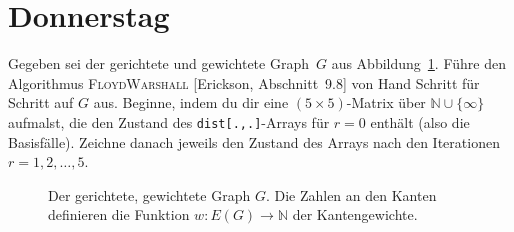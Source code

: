\documentclass{uebung_cs}
\begin{document}
\section*{Donnerstag}

\begin{aufgabe}
  Gegeben sei der gerichtete und gewichtete Graph~$G$ aus Abbildung~\ref{example_graph}.
  Führe den Algorithmus \textsc{FloydWarshall} [Erickson, Abschnitt~9.8] von Hand Schritt für Schritt auf $G$ aus. 
  Beginne, indem du dir eine $(5\times 5)$-Matrix über $\mathbb N\cup\{\infty\}$ aufmalst, die den Zustand des \texttt{dist[.,.]}-Arrays für $r=0$ enthält (also die Basisfälle).
  Zeichne danach jeweils den Zustand des Arrays nach den Iterationen $r=1,2,\dots,5$.

\begin{figure}[ht]
	\begin{center}
		\caption{\label{example_graph}Der gerichtete, gewichtete Graph $G$. Die Zahlen an den Kanten definieren die Funktion $w\colon E(G)\to\mathbb N$ der Kantengewichte.}
	\end{center}
\end{figure}
\end{aufgabe}
\end{document}
